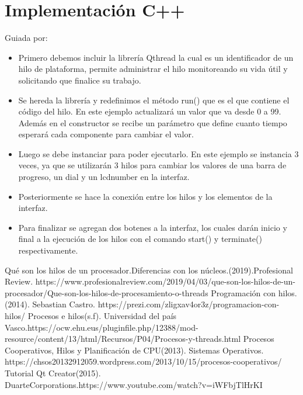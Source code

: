 \documentclass{report}   %
\begin{document}
\section*{Implementación C++}
Guiada por: \cite{5}
\begin{itemize}
    \item Primero debemos incluir la librería Qthread la cual es un identificador de un hilo de plataforma, permite administrar el hilo monitoreando su vida útil y solicitando que finalice su trabajo.
    \item Se hereda la librería y  redefinimos el método run() que es  el que contiene el código del hilo. En este ejemplo actualizará un valor que va desde 0 a 99. Además en el constructor se recibe un parámetro que define cuanto tiempo esperará cada componente para cambiar el valor.
    \item Luego se debe instanciar para poder ejecutarlo. En este ejemplo se instancia 3 veces, ya que se utilizarán 3 hilos para cambiar los valores de una barra de progreso, un dial y un lcdnumber en la interfaz.
    \item Posteriormente se hace la conexión entre los hilos y los elementos de la interfaz.
    \item Para finalizar se agregan dos botenes a la interfaz, los cuales darán inicio y final a la ejecución de los hilos con el comando start() y  terminate() respectivamente.
\end{itemize}

\begin{thebibliography}{0}
   Qué son los hilos de un procesador.Diferencias con los núcleos.(2019).Profesional Review.
  https://www.profesionalreview.com/2019/04/03/que-son-los-hilos-de-un-procesador/Que-son-los-hilos-de-procesamiento-o-threads
   Programación con hilos.(2014). Sebastian Castro. https://prezi.com/zligxav4or3z/programacion-con-hilos/
   Procesos e hilos(s.f). Universidad del país Vasco.https://ocw.ehu.eus/pluginfile.php/12388/mod-resource/content/13/html/Recursos/P04/Procesos-y-threads.html
   Procesos Cooperativos, Hilos y Planificación de CPU(2013). Sistemas Operativos. https://chsos20132912059.wordpress.com/2013/10/15/procesos-cooperativos/
   Tutorial Qt Creator(2015). DuarteCorporations.https://www.youtube.com/watch?v=iWFbjTlHrKI
\end{thebibliography}
\end{document}
